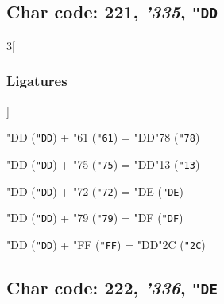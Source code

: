 \documentclass{article}
\newlength{\maxcharwidth}
\begin{document}
\subsection{Char code: 221, {\it'335}, {\tt"DD}}
\label{char_221}


\begin{multicols}{3}[\subsubsection{Ligatures}]

{\testfont\char"DD\noboundary} ({\tt"DD}) + {\testfont\char"61\noboundary} ({\tt"61}) = {\testfont\char"DD\noboundary}{\testfont\char"78\noboundary} ({\tt"78}) 

{\testfont\char"DD\noboundary} ({\tt"DD}) + {\testfont\char"75\noboundary} ({\tt"75}) = {\testfont\char"DD\noboundary}{\testfont\char"13\noboundary} ({\tt"13}) 

{\testfont\char"DD\noboundary} ({\tt"DD}) + {\testfont\char"72\noboundary} ({\tt"72}) = {\testfont\char"DE\noboundary} ({\tt"DE}) 

{\testfont\char"DD\noboundary} ({\tt"DD}) + {\testfont\char"79\noboundary} ({\tt"79}) = {\testfont\char"DF\noboundary} ({\tt"DF}) 

{\testfont\char"DD\noboundary} ({\tt"DD}) + {\testfont\char"FF\noboundary} ({\tt"FF}) = {\testfont\char"DD\noboundary}{\testfont\char"2C\noboundary} ({\tt"2C}) 

\end{multicols}

\subsection{Char code: 222, {\it'336}, {\tt"DE}}
\label{char_222}

\end{document}

